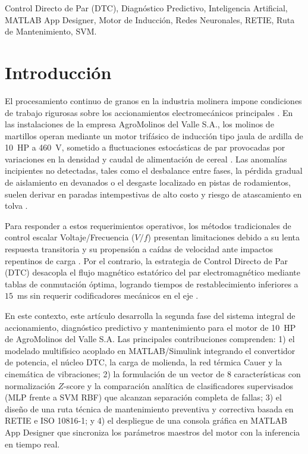 \documentclass[conference]{IEEEtran}
\begin{document}
\renewcommand\IEEEkeywordsname{Palabras clave}
\begin{IEEEkeywords}
Control Directo de Par (DTC), Diagnóstico Predictivo, Inteligencia Artificial, MATLAB App Designer, Motor de Inducción, Redes Neuronales, RETIE, Ruta de Mantenimiento, SVM.
\end{IEEEkeywords}

\section{Introducción}
El procesamiento continuo de granos en la industria molinera impone condiciones de trabajo rigurosas sobre los accionamientos electromecánicos principales \cite{moubray1997}. En las instalaciones de la empresa AgroMolinos del Valle S.A., los molinos de martillos operan mediante un motor trifásico de inducción tipo jaula de ardilla de 10~HP a 460~V, sometido a fluctuaciones estocásticas de par provocadas por variaciones en la densidad y caudal de alimentación de cereal \cite{nandi2005}. Las anomalías incipientes no detectadas, tales como el desbalance entre fases, la pérdida gradual de aislamiento en devanados o el desgaste localizado en pistas de rodamientos, suelen derivar en paradas intempestivas de alto costo y riesgo de atascamiento en tolva \cite{gao2015}.

Para responder a estos requerimientos operativos, los métodos tradicionales de control escalar Voltaje/Frecuencia ($V/f$) presentan limitaciones debido a su lenta respuesta transitoria y su propensión a caídas de velocidad ante impactos repentinos de carga \cite{bose2006}. Por el contrario, la estrategia de Control Directo de Par (DTC) desacopla el flujo magnético estatórico del par electromagnético mediante tablas de conmutación óptima, logrando tiempos de restablecimiento inferiores a $15$~ms sin requerir codificadores mecánicos en el eje \cite{takahashi1986, vas1998}.

En este contexto, este artículo desarrolla la segunda fase del sistema integral de accionamiento, diagnóstico predictivo y mantenimiento para el motor de 10~HP de AgroMolinos del Valle S.A. Las principales contribuciones comprenden: 1) el modelado multifísico acoplado en MATLAB/Simulink integrando el convertidor de potencia, el núcleo DTC, la carga de molienda, la red térmica Cauer y la cinemática de vibraciones; 2) la formulación de un vector de 8 características con normalización $Z$-score y la comparación analítica de clasificadores supervisados (MLP frente a SVM RBF) que alcanzan separación completa de fallas; 3) el diseño de una ruta técnica de mantenimiento preventiva y correctiva basada en RETIE e ISO 10816-1; y 4) el despliegue de una consola gráfica en MATLAB App Designer que sincroniza los parámetros maestros del motor con la inferencia en tiempo real.
\end{document}
